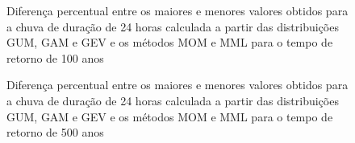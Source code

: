 \documentclass[
]{agujournal2019}
\begin{document}
\begin{figure}


\caption{\label{fig-Figura19}Diferença percentual entre os maiores e
menores valores obtidos para a chuva de duração de 24 horas calculada a
partir das distribuições GUM, GAM e GEV e os métodos MOM e MML para o
tempo de retorno de 100 anos}

\end{figure}%

\begin{figure}


\caption{\label{fig-Figura20}Diferença percentual entre os maiores e
menores valores obtidos para a chuva de duração de 24 horas calculada a
partir das distribuições GUM, GAM e GEV e os métodos MOM e MML para o
tempo de retorno de 500 anos}

\end{figure}%
\end{document}
